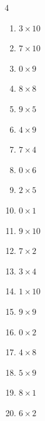 \begin{multicols}{4}
\begin{enumerate}
  \item $3\times 10$
        \phantom{$=30$}

  \item $7\times 10$
        \phantom{$=70$}

  \item $0\times 9$
        \phantom{$=0$}

  \item $8\times 8$
        \phantom{$=64$}

  \item $9\times 5$
        \phantom{$=45$}

\columnbreak %

\resetques

  \item $4\times 9$
        \phantom{$=36$}

  \item $7\times 4$
        \phantom{$=28$}

  \item $0\times 6$
        \phantom{$=0$}

  \item $2\times 5$
        \phantom{$=10$}

  \item $0\times 1$
        \phantom{$=0$}

  \item $9\times 10$
        \phantom{$=90$}

  \item $7\times 2$
        \phantom{$=14$}

  \item $3\times 4$
        \phantom{$=12$}

  \item $1\times 10$
        \phantom{$=10$}

  \item $9\times 9$
        \phantom{$=81$}

  \item $0\times 2$
        \phantom{$=0$}

  \item $4\times 8$
        \phantom{$=32$}

  \item $5\times 9$
        \phantom{$=45$}

  \item $8\times 1$
        \phantom{$=8$}

  \item $6\times 2$
        \phantom{$=12$}


\end{enumerate}
\end{multicols}
